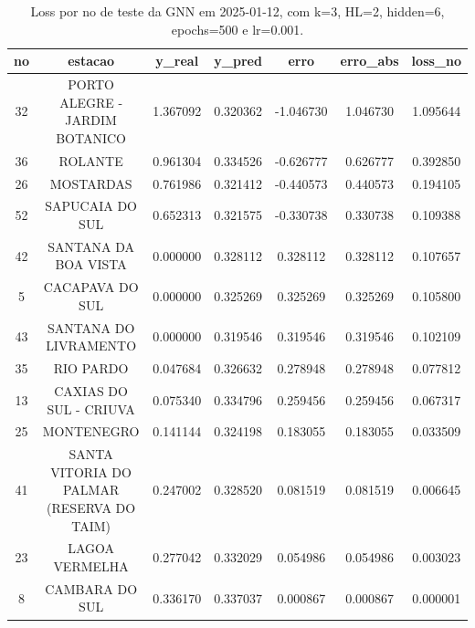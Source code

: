 \begin{table}[h]
\centering
\caption{Loss por no de teste da GNN em 2025-01-12, com k=3, HL=2, hidden=6, epochs=500 e lr=0.001.}
\label{tab:gnn_loss_k3_hl2_h6_e500_d20250112}
\begin{tabular}{ccccccc}
\toprule
no & estacao & y\_real & y\_pred & erro & erro\_abs & loss\_no \\
\midrule
32 & PORTO ALEGRE - JARDIM BOTANICO & 1.367092 & 0.320362 & -1.046730 & 1.046730 & 1.095644 \\
36 & ROLANTE & 0.961304 & 0.334526 & -0.626777 & 0.626777 & 0.392850 \\
26 & MOSTARDAS & 0.761986 & 0.321412 & -0.440573 & 0.440573 & 0.194105 \\
52 & SAPUCAIA DO SUL & 0.652313 & 0.321575 & -0.330738 & 0.330738 & 0.109388 \\
42 & SANTANA DA BOA VISTA & 0.000000 & 0.328112 & 0.328112 & 0.328112 & 0.107657 \\
5 & CACAPAVA DO SUL & 0.000000 & 0.325269 & 0.325269 & 0.325269 & 0.105800 \\
43 & SANTANA DO LIVRAMENTO & 0.000000 & 0.319546 & 0.319546 & 0.319546 & 0.102109 \\
35 & RIO PARDO & 0.047684 & 0.326632 & 0.278948 & 0.278948 & 0.077812 \\
13 & CAXIAS DO SUL - CRIUVA & 0.075340 & 0.334796 & 0.259456 & 0.259456 & 0.067317 \\
25 & MONTENEGRO & 0.141144 & 0.324198 & 0.183055 & 0.183055 & 0.033509 \\
41 & SANTA VITORIA DO PALMAR (RESERVA DO TAIM) & 0.247002 & 0.328520 & 0.081519 & 0.081519 & 0.006645 \\
23 & LAGOA VERMELHA & 0.277042 & 0.332029 & 0.054986 & 0.054986 & 0.003023 \\
8 & CAMBARA DO SUL & 0.336170 & 0.337037 & 0.000867 & 0.000867 & 0.000001 \\
\bottomrule
\end{tabular}
\end{table}
